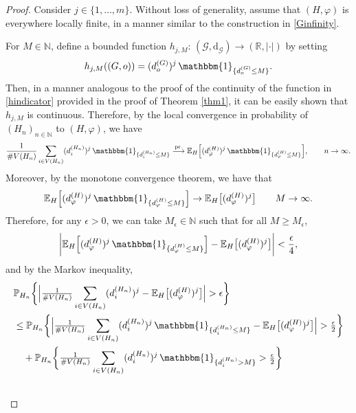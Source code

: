 \documentclass[11pt]{article}
\numberwithin{equation}{section}
\theoremstyle{plain}
\newcommand{\N}{\mathbb N}
\newcommand{\R}{\mathbb R}
\newcommand{\prob}{\overset{\mathrm{pr.}}{\longrightarrow}}
\newcommand{\E}{\mathbb E}
\renewcommand{\P}{\mathbb P}
\begin{document}
\begin{proof}
Consider $j \in \{1, \ldots, m\}$. Without loss of generality, assume that $(H, \varphi)$ is everywhere locally finite, in a manner similar to the construction in \eqref{Ginfinity}. 

For $M \in \N$, define a bounded function $h_{j,M}\colon\,(\mathscr{G},\mathrm{d}_{\mathscr{G}}) \to (\R,\vert\cdot\vert)$ by setting
\begin{align*}
h_{j,M}((G,o))=(d^{(G)}_{o})^{j}\,\mathbbm{1}_{\{d^{(G)}_{o}\leq M\}}.
\end{align*}
Then, in a manner analogous to the proof of the continuity of the function in \eqref{hindicator} provided in the proof of Theorem \ref{thm1}, it can be easily shown that $h_{j,M}$ is continuous. Therefore, by the local convergence in probability of $(H_{n})_{n\in\N}$ to $(H, \varphi)$, we have
\begin{align}\label{lem1}
\frac{1}{\#V(H_{n})}\sum_{i\in V(H_{n})}(d_{i}^{(H_{n})})^{j}\,\mathbbm{1}_{\{d_{i}^{(H_{n})}\leq M\}}\prob \E_{H}\Big[(d_{\varphi}^{(H)})^{j}\,\mathbbm{1}_{\{d_{\varphi}^{(H)}\leq M\}}\Big],\qquad n\to\infty .
\end{align}
Moreover, by the monotone convergence theorem, we have that
\begin{align*}
\E_{H}\Big[(d_{\varphi}^{(H)})^{j}\,\mathbbm{1}_{\{d_{\varphi}^{(H)}\leq M\}}\Big]\to\E_{H}\big[(d_{\varphi}^{(H)})^{j}\big]\qquad M\to\infty .
\end{align*}
Therefore, for any $\epsilon >0$, we can take $M_{\epsilon}\in\N$ such that for all $M\geq M_{\epsilon}$,
\begin{align*}
\bigg|\E_{H}\Big[(d_{\varphi}^{(H)})^{j}\,\mathbbm{1}_{\{d_{\varphi}^{(H)}\leq M\}}\Big]-\E_{H}\big[(d_{\varphi}^{(H)})^{j}\big]\bigg|<\frac{\epsilon}{4},
\end{align*}
and by the Markov inequality,
\begin{align*}
&\P_{H_{n}}\bigg\{\Big |\tfrac{1}{\#V(H_{n})}\sum_{i\in V(H_{n})}(d_{i}^{(H_{n})})^{j}-\E_{H}\big[(d_{\varphi}^{(H)})^{j}\big]\Big |>\epsilon\bigg\}
\\&\leq \P_{H_{n}}\bigg\{\Big |\tfrac{1}{\#V(H_{n})}\sum_{i\in V(H_{n})}(d_{i}^{(H_{n})})^{j}\,\mathbbm{1}_{\{d_{i}^{(H_{n})}\leq M\}}-\E_{H}\big[(d_{\varphi}^{(H)})^{j}\big]\Big|>\tfrac{\epsilon}{2}\bigg\}\\&\quad
+\P_{H_{n}}\bigg\{\tfrac{1}{\#V(H_{n})}\sum_{i\in V(H_{n})}(d_{i}^{(H_{n})})^{j}\,\mathbbm{1}_{\{d_{i}^{(H_{n})}> M\}}>\tfrac{\epsilon}{2}\bigg\}\\&

\end{align*}
\end{proof}
\end{document}
